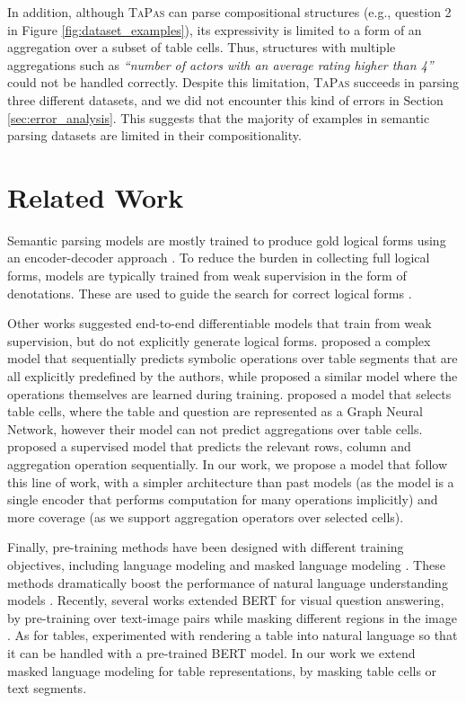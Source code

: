 \documentclass[11pt,a4paper]{article}
\newcommand{\ours}{\textsc{TaPas}\xspace}
\begin{document}
In addition, although \ours can parse compositional structures (e.g., question 2 in Figure \ref{fig:dataset_examples}), its expressivity is limited to a form of an aggregation over a subset of table cells. Thus, structures with multiple aggregations such as \textit{``number of actors with an average rating higher than 4''} could not be handled correctly. Despite this limitation, \ours succeeds in parsing three different datasets, and we did not encounter this kind of errors in Section \ref{sec:error_analysis}. This suggests that the majority of examples in semantic parsing datasets are limited in their compositionality.

 \section{Related Work}

Semantic parsing models are mostly trained to produce gold logical forms using an encoder-decoder approach \cite{jia2016recombination,dong2016logical}.
To reduce the burden in collecting full logical forms, models are typically trained from weak supervision in the form of denotations. These are used to guide the search for correct logical forms \cite{clarke10world,liang11dcs}. 

Other works suggested end-to-end differentiable models that train from weak supervision, but do not explicitly generate logical forms.  proposed a complex model that sequentially predicts symbolic operations over table segments that are all explicitly predefined by the authors, while  proposed a similar model where the operations themselves are learned during training.  proposed a model that selects table cells, where the table and question are represented as a Graph Neural Network, however their model can not predict aggregations over table cells. 
 proposed a supervised model that predicts the relevant rows, column and aggregation operation sequentially.
In our work, we propose a model that follow this line of work, with a simpler architecture than past models (as the model is a single encoder that performs computation for many operations implicitly) and more coverage (as we support aggregation operators over selected cells).

Finally, pre-training methods have been designed with different training objectives, including language modeling \cite{dai2015semi,peters2018elmo,radford2018improving} and masked language modeling \cite{devlin2018BERT, lample2019cross}. These methods dramatically boost the performance of natural language understanding models \cite[\emph{inter alia}]{peters2018elmo}. Recently, several works extended BERT for visual question answering, by pre-training over text-image pairs while masking different regions in the image \cite{tan2019lxmert,lu2019vilbert}. As for tables,  experimented with rendering a table into natural language so that it can be handled with a pre-trained BERT model. In our work we extend masked language modeling for table representations, by masking table cells or text segments. 
\end{document}
